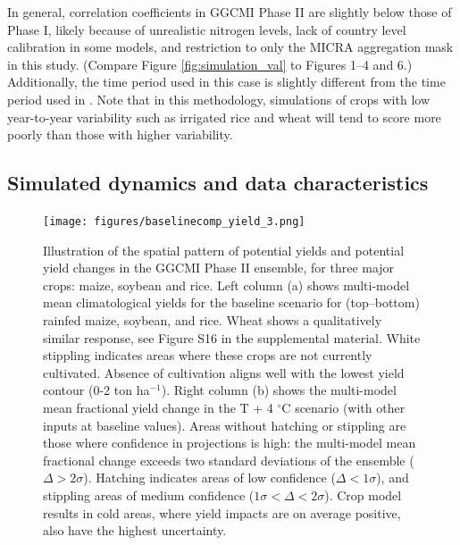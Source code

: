 \documentclass[gmd, manuscript]{copernicus} %
\begin{document}
In general, correlation coefficients in GGCMI Phase II are slightly below those of Phase I, likely because of unrealistic nitrogen levels, lack of country level calibration in some models, and restriction to only the MICRA aggregation mask in this study. 
(Compare Figure \ref{fig:simulation_val} to \citet{muller_global_2017} Figures 1--4 and 6.)  
Additionally, the time period used in this case is slightly different from the time period used in \citet{muller_global_2017}. 
Note that in this methodology, simulations of crops with low year-to-year variability such as irrigated rice and wheat will tend to score more poorly than those with higher variability.

\subsection{Simulated dynamics and data characteristics}
\begin{figure}[ht]
\centering
   \texttt{[image: figures/baselinecomp\_yield\_3.png]} 
   \caption{Illustration of the spatial pattern of potential yields and potential yield changes in the GGCMI Phase II ensemble, for three major crops: maize, soybean and rice. 
   Left column (a) shows multi-model mean climatological yields for the baseline scenario for (top--bottom) rainfed maize, soybean, and rice. 
   Wheat shows a qualitatively similar response, see Figure S16 in the supplemental material. 
   White stippling indicates areas where these crops are not currently cultivated. 
   Absence of cultivation aligns well with the lowest yield contour (0-2 ton ha$^{-1}$). 
   Right column (b) shows the multi-model mean fractional yield change in the T + 4 $^{\circ}$C scenario (with other inputs at baseline values). 
   Areas without hatching or stippling are those where confidence in projections is high: the multi-model mean fractional change exceeds two standard deviations of the ensemble ($\Delta > 2\sigma$). 
   Hatching indicates areas of low confidence ($\Delta < 1 \sigma$), and stippling areas of medium confidence ($1 \sigma < \Delta < 2 \sigma$). 
   Crop model results in cold areas, where yield impacts are on average positive, also have the highest uncertainty.}
   \label{fig:maizesoybaseline}
\end{figure}
\end{document}
